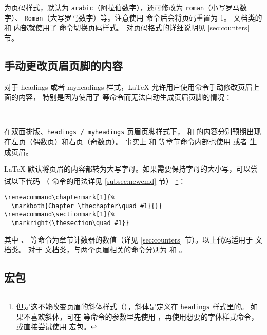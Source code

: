  为页码样式，默认为 \texttt{arabic}（阿拉伯数字），还可修改为 \texttt{roman}（小写罗马数字）、
\texttt{Roman}（大写罗马数字）等。注意使用  命令后会将页码重置为 1。 文档类的  和  内部就使用了  命令切换页码样式。
对页码格式的详细说明见 \ref{sec:counters} 节。

\subsection{手动更改页眉页脚的内容}\label{subsec:marks}

对于 headings 或者 myheadings 样式，\LaTeX{} 允许用户使用命令手动修改页眉上面的内容，
特别是因为使用了  等命令而无法自动生成页眉页脚的情况：
\begin{command}
\\
\end{command}

在双面排版、\texttt{headings / myheadings} 页眉页脚样式下， 和  的内容分别预期出现在左页（偶数页）和右页（奇数页）。
事实上  和  等章节命令内部也使用  或者  生成页眉。

\LaTeX{} 默认将页眉的内容都转为大写字母。如果需要保持字母的大小写，可以尝试以下代码
（\cmd{\renewcommand} 命令的用法详见 \ref{subsec:newcmd} 节）%
\footnote{但是这不能改变页眉的斜体样式（），斜体是定义在 \texttt{headings} 样式里的。
如果不喜欢斜体，可在  等命令的参数里先使用  ，再使用想要的字体样式命令，
或直接尝试使用  宏包。}：
\begin{verbatim}
\renewcommand\chaptermark[1]{%
  \markboth{Chapter \thechapter\quad #1}{}}
\renewcommand\sectionmark[1]{%
  \markright{\thesection\quad #1}}
\end{verbatim}

其中 、 等命令为章节计数器的数值（详见 \ref{sec:counters} 节）。以上代码适用于  文档类。
对于  文档类，与两个页眉相关的命令分别为  和 。

\subsection{ 宏包}\label{subsec:fancyhdr}

